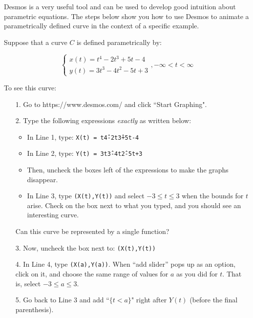 \documentclass{ximera}
\author{Jim Talamo}
\begin{document}
\begin{exercise}
Desmos is a very useful tool and can be used to develop good intuition about parametric equations.  The steps below show you how to use Desmos to animate a parametrically defined curve in the context of a specific example.

Suppose that a curve $C$ is defined parametrically by:

\[
 \begin{cases}
x(t)=  t^4-2t^3+5t-4\\
y(t)=  3t^3-4t^2-5t+3
\end{cases} 
, -\infty < t < \infty
\]

To see this curve:

\begin{itemize}
\item[1.] Go to https://www.desmos.com/ and click ``Start Graphing".
\item[2.] Type the following expressions \emph{exactly} as written below:
\begin{itemize}
\item In Line 1, type: \texttt{X(t) = t\^4-2t\^3+5t-4}  
\item In Line 2, type: \texttt{Y(t) = 3t\^3-4t\^2-5t+3}
\item Then, uncheck the boxes left of the expressions to make the graphs disappear.
\item In Line 3, type \texttt{(X(t),Y(t))} and select $-3\leq t \leq3$ when the bounds for $t$ arise.  Check on the box next to what you typed, and you should see an interesting curve.
\end{itemize}
Can this curve be represented by a single function?

\begin{multipleChoice}
\end{multipleChoice}

\item[3.] Now, uncheck the box next to: \texttt{(X(t),Y(t))}
\item[4.] In Line 4, type \texttt{(X(a),Y(a))}.  When ``add slider'' pops up as an option, click on it, and choose the same range of values for $a$ as you did for $t$.  That is, select $-3 \leq a \leq 3$.
\item[5.] Go back to Line 3 and add ``$\{t<a\}$" right after $Y(t)$ (before the final parenthesis).  


\end{itemize}
\end{exercise}
\end{document}

